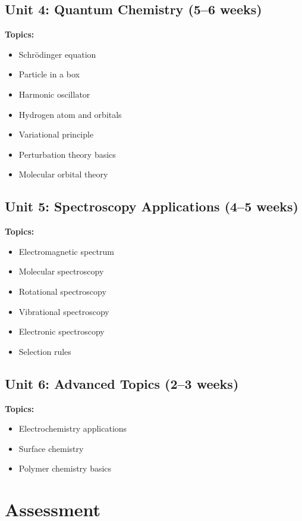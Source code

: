 \documentclass[12pt,oneside]{book}
\begin{document}
\subsection{Unit 4: Quantum Chemistry (5--6 weeks)}

\textbf{Topics:}
\begin{itemize}
    \item Schrödinger equation
    \item Particle in a box
    \item Harmonic oscillator
    \item Hydrogen atom and orbitals
    \item Variational principle
    \item Perturbation theory basics
    \item Molecular orbital theory
\end{itemize}

\subsection{Unit 5: Spectroscopy Applications (4--5 weeks)}

\textbf{Topics:}
\begin{itemize}
    \item Electromagnetic spectrum
    \item Molecular spectroscopy
    \item Rotational spectroscopy
    \item Vibrational spectroscopy
    \item Electronic spectroscopy
    \item Selection rules
\end{itemize}

\subsection{Unit 6: Advanced Topics (2--3 weeks)}

\textbf{Topics:}
\begin{itemize}
    \item Electrochemistry applications
    \item Surface chemistry
    \item Polymer chemistry basics
\end{itemize}

\section{Assessment}
\end{document}
